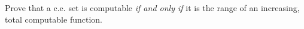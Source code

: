 \begin{problem}
  Prove that a c.e. set is computable \emph{if and only if} it is the
  range of an increasing, total computable function.

  \begin{answer}
    
  \end{answer}
\end{problem}
